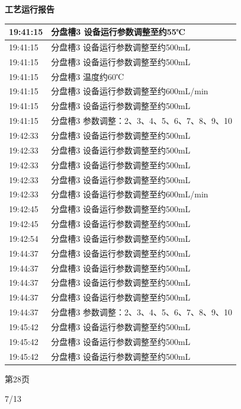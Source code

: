 \documentclass[UTF8,10pt,a4paper,fontset=fandol]{ctexart}
\newcommand{\handwritten}[1]{#1}
\begin{document}
\hfill
\begin{minipage}[t]{0.48\linewidth}
\centering
\textbf{工艺运行报告}

\smallskip
\begin{tabular}{|p{1.25cm}|p{5.35cm}|}
\hline
19:41:15 & 分盘槽3 设备运行参数调整至约55℃ \\ \hline
19:41:15 & 分盘槽3 设备运行参数调整至约500mL \\ \hline
19:41:15 & 分盘槽3 设备运行参数调整至约500mL \\ \hline
19:41:15 & 分盘槽3 温度约60℃ \\ \hline
19:41:15 & 分盘槽3 设备运行参数调整至约600mL/min \\ \hline
19:41:15 & 分盘槽3 设备运行参数调整至约500mL \\ \hline
19:41:15 & 分盘槽3 参数调整：2、3、4、5、6、7、8、9、10 \\ \hline
19:42:33 & 分盘槽3 设备运行参数调整至约500mL \\ \hline
19:42:33 & 分盘槽3 设备运行参数调整至约500mL \\ \hline
19:42:33 & 分盘槽3 设备运行参数调整至约500mL \\ \hline
19:42:33 & 分盘槽3 设备运行参数调整至约500mL \\ \hline
19:42:33 & 分盘槽3 设备运行参数调整至约600mL/min \\ \hline
19:42:45 & 分盘槽3 设备运行参数调整至约500mL \\ \hline
19:42:45 & 分盘槽3 设备运行参数调整至约500mL \\ \hline
19:42:54 & 分盘槽3 设备运行参数调整至约500mL \\ \hline
19:44:37 & 分盘槽3 设备运行参数调整至约500mL \\ \hline
19:44:37 & 分盘槽3 设备运行参数调整至约500mL \\ \hline
19:44:37 & 分盘槽3 设备运行参数调整至约500mL \\ \hline
19:44:37 & 分盘槽3 设备运行参数调整至约500mL \\ \hline
19:44:37 & 分盘槽3 参数调整：2、3、4、5、6、7、8、9、10 \\ \hline
19:45:42 & 分盘槽3 设备运行参数调整至约500mL \\ \hline
19:45:42 & 分盘槽3 设备运行参数调整至约500mL \\ \hline
19:45:42 & 分盘槽3 设备运行参数调整至约500mL \\ \hline
\end{tabular}

\medskip
第28页

\hfill
\handwritten{7/13}
\end{minipage}
\end{document}
